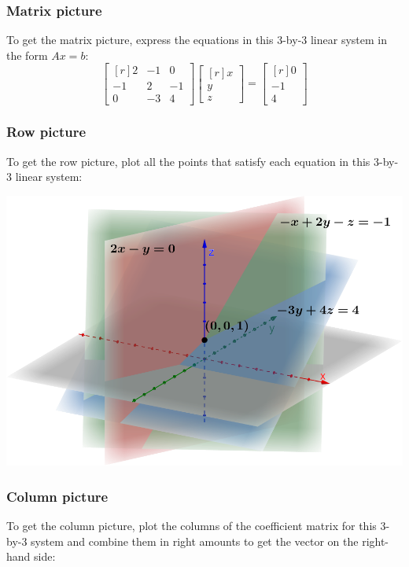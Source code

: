 \documentclass[../main.tex]{subfiles}
\begin{document}
\subsubsection{Matrix picture}
To get the matrix picture, express the equations in this 3-by-3 linear system in the form $Ax = b$:
\[
    \begin{bmatrix*}[r]
        2 & -1 & 0 \\
        -1 & 2 & -1 \\
        0 & -3 & 4
    \end{bmatrix*}
    \begin{bmatrix*}[r]
        x \\
        y \\
        z
    \end{bmatrix*}
    =
    \begin{bmatrix*}[r]
        0 \\
        -1 \\
        4
    \end{bmatrix*}
\]

\subsubsection{Row picture}
To get the row picture, plot all the points that satisfy each equation in this 3-by-3 linear system:

\begingroup
\centering
\includegraphics[width = \columnwidth]{../figures/fig03_3d-row-pic/geogebra-derived}
\par
\endgroup

\subsubsection{Column picture}
To get the column picture, plot the columns of the coefficient matrix for this 3-by-3 system and combine them in right amounts to get the vector on the right-hand side:
\end{document}
